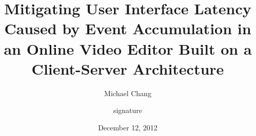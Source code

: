 \documentclass[se,resubmit]{uw-wkrpt}
\begin{document}

\title{ Mitigating User Interface Latency Caused by Event Accumulation in an
Online Video Editor Built on a Client-Server Architecture }

\author{Michael Chang}


\signature{signature}

\address{30 Doncrest Rd.\\*
         Richmond Hill, ON\ \ L4B 1A2}












\date{December 12, 2012}

\maketitle
\end{document}
